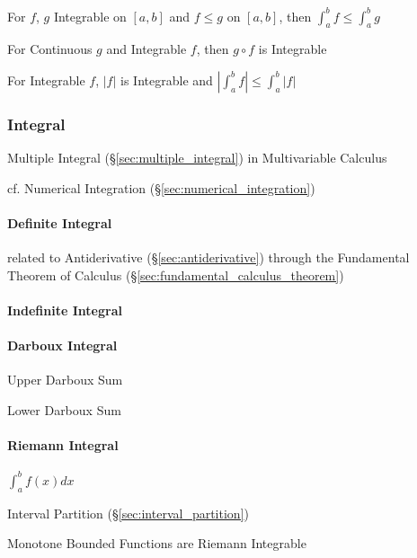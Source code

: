 For $f$, $g$ Integrable on $[a,b]$ and $f \leq g$ on $[a,b]$, then
$\int_a^b f \leq \int_a^b g$

For Continuous $g$ and Integrable $f$, then $g \circ f$ is Integrable

For Integrable $f$, $|f|$ is Integrable and $|\int_a^b f| \leq
\int_a^b |f|$



\subsubsection{Integral}\label{sec:integral}

\fist Multiple Integral (\S\ref{sec:multiple_integral}) in Multivariable
Calculus

cf. Numerical Integration (\S\ref{sec:numerical_integration})



\paragraph{Definite Integral}\label{sec:definite_integral}\hfill

\fist related to Antiderivative (\S\ref{sec:antiderivative}) through the
Fundamental Theorem of Calculus (\S\ref{sec:fundamental_calculus_theorem})



\paragraph{Indefinite Integral}\label{sec:indefinite_integral}\hfill

\paragraph{Darboux Integral}\label{sec:darboux_integral}\hfill

Upper Darboux Sum

Lower Darboux Sum



\paragraph{Riemann Integral}\label{sec:riemann_integral}\hfill

$\int_a^b f(x) dx$

Interval Partition (\S\ref{sec:interval_partition})

Monotone Bounded Functions are Riemann Integrable


